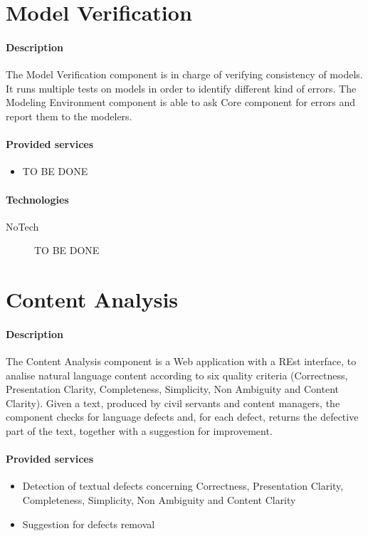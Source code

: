 \documentclass{learnpad}
\begin{document}
\section{Model Verification}\label{sec:model-verification}
\paragraph{Description}
The Model Verification component is in charge of verifying consistency of
models.  It runs multiple tests on models in order to identify different kind of
errors.  The Modeling Environment component is able to ask \learnpad Core
component for errors and report them to the modelers.

\paragraph{Provided services}
\begin{itemize}
	\item TO BE DONE
\end{itemize}

\paragraph{Technologies}
\begin{description}
	\item[NoTech] TO BE DONE
\end{description}

\section{Content Analysis}\label{sec:content-analysis}
\paragraph{Description}
The Content Analysis component is a Web application with a REst interface, to
analise natural language content according to six quality criteria (Correctness,
Presentation Clarity, Completeness, Simplicity, Non Ambiguity and Content
Clarity). Given a text, produced by civil servants and content managers, the
component checks for language defects and, for each defect, returns the
defective part of the text, together with a suggestion for improvement.

\paragraph{Provided services}
\begin{itemize}
	\item Detection of textual defects concerning Correctness, Presentation Clarity, Completeness, Simplicity, Non Ambiguity and Content Clarity
	\item Suggestion for defects removal
\end{itemize}
\end{document}
